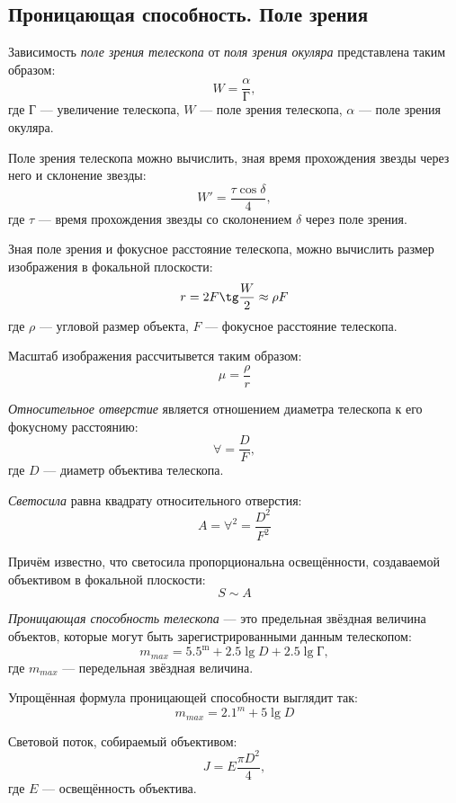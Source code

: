 \subsection{Проницающая способность. Поле зрения}
Зависимость \textit{поле зрения телескопа} от \textit{поля зрения окуляра} представлена таким образом:
\begin{equation}
W=\frac{\alpha}{\text{Г}},
\end{equation}
где $\text{Г}$ --- увеличение телескопа, $W$ --- поле зрения телескопа, $\alpha$ --- поле зрения окуляра.

Поле зрения телескопа можно вычислить, зная время прохождения звезды через него и склонение звезды:
\begin{equation}
W'=\frac{\tau\cos\delta}{4},
\end{equation}
где $\tau$ --- время прохождения звезды со сколонением $\delta$ через поле зрения.

Зная поле зрения и фокусное расстояние телескопа, можно вычислить размер изображения в фокальной плоскости:
\begin{equation}
r=2F\tg\frac{W}{2}\approx\rho F
\end{equation}
где $\rho$ --- угловой размер объекта, $F$ --- фокусное расстояние телескопа.

Масштаб изображения рассчитывется таким образом:
\begin{equation}
\mu=\frac{\rho}{r}
\end{equation}

\textit{Относительное отверстие} является отношением диаметра телескопа к его фокусному расстоянию:
\begin{equation}
\forall=\frac{D}{F},
\end{equation}
где $D$ --- диаметр объектива телескопа.

\textit{Светосила} равна квадрату относительного отверстия:
\begin{equation}
A=\forall^2=\frac{D^2}{F^2}
\end{equation}

Причём известно, что светосила пропорциональна освещённости, создаваемой объективом в фокальной плоскости:
\begin{equation}
S\sim A
\end{equation}

\textit{Проницающая способность телескопа} --- это предельная звёздная величина объектов, которые могут быть зарегистрированными данным телескопом:
\begin{equation}
m_{max}=5.5^{\text{m}}+2.5\lg{D}+2.5\lg{\text{Г}},
\end{equation}
где $m_{max}$ --- передельная звёздная величина.

Упрощённая формула проницающей способности выглядит так:
\begin{equation}
m_{max}=2.1^m+5\lg{D}
\end{equation}

Световой поток, собираемый объективом:
\begin{equation}
J=E\frac{\pi D^2}{4},
\end{equation}
где $E$ --- освещённость объектива.
